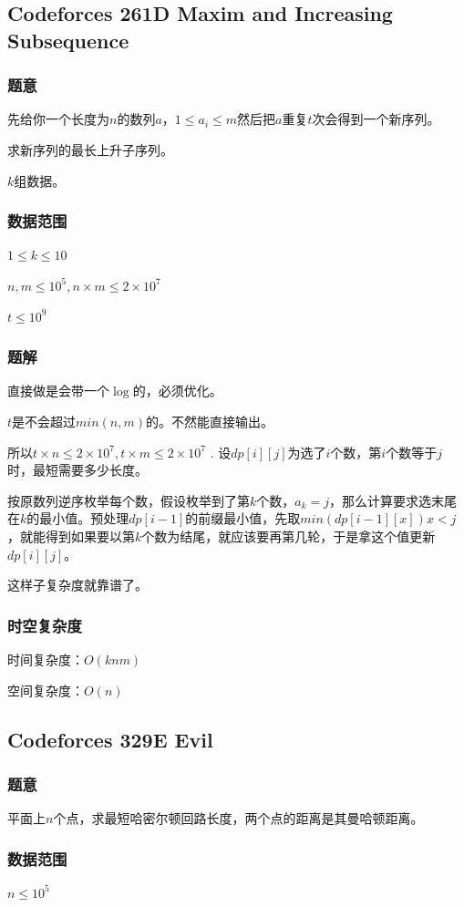 \documentclass{ctexart}
\begin{document}
\subsection{Codeforces 261D Maxim and Increasing Subsequence}
\subsubsection{题意}
先给你一个长度为$n$的数列$a$，$1 \le a_i \le m$然后把$a$重复$t$次会得到一个新序列。

求新序列的最长上升子序列。

$k$组数据。
\subsubsection{数据范围}
$1 \le k \le 10$

$n,m \le 10^5,n \times m \le 2 \times 10^7$

$t \le 10^9$
\subsubsection{题解}
直接做是会带一个$\log$的，必须优化。

$t$是不会超过$min(n,m)$的。不然能直接输出。

所以$t \times n \le 2 \times 10^7,t \times m \le 2 \times 10^7$
.
设$dp[i][j]$为选了$i$个数，第$i$个数等于$j$时，最短需要多少长度。

按原数列逆序枚举每个数，假设枚举到了第$k$个数，$a_k=j$，那么计算要求选末尾在$k$的最小值。预处理$dp[i-1]$的前缀最小值，先取$min(dp[i-1][x])x<j$，就能得到如果要以第$k$个数为结尾，就应该要再第几轮，于是拿这个值更新$dp[i][j]$。

这样子复杂度就靠谱了。
\subsubsection{时空复杂度}
时间复杂度：$O(knm)$

空间复杂度：$O(n)$
\subsection{Codeforces 329E Evil}
\subsubsection{题意}
平面上$n$个点，求最短哈密尔顿回路长度，两个点的距离是其曼哈顿距离。
\subsubsection{数据范围}
$n \le 10^5$
\end{document}
